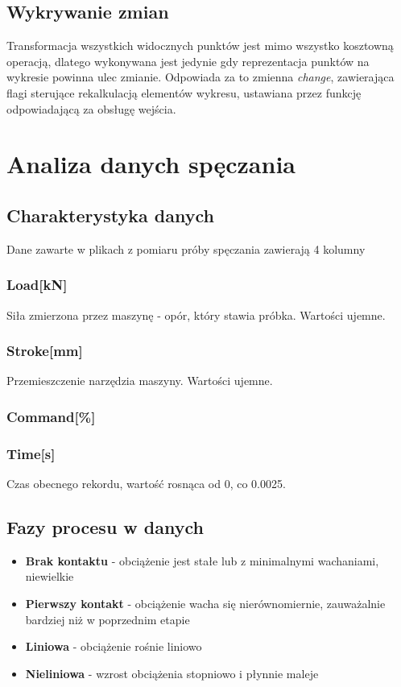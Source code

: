 \documentclass{article}
\begin{document}
	\subsection{Wykrywanie zmian}
	Transformacja wszystkich widocznych punktów jest mimo wszystko kosztowną operacją, dlatego wykonywana jest jedynie gdy reprezentacja punktów na wykresie powinna ulec zmianie. Odpowiada za to zmienna \textit{change}, zawierająca flagi sterujące rekalkulacją elementów wykresu, ustawiana przez funkcję odpowiadającą za obsługę wejścia.
	
	
	\pagebreak
	\section{Analiza danych spęczania}
	\subsection{Charakterystyka danych}
	Dane zawarte w plikach z pomiaru próby spęczania zawierają 4 kolumny
	\subsubsection{Load[kN]}
	Siła zmierzona przez maszynę - opór, który stawia próbka. Wartości ujemne.
	\subsubsection{Stroke[mm]}
	Przemieszczenie narzędzia maszyny. Wartości ujemne.
	\subsubsection{Command[\%]}
	
	\subsubsection{Time[s]}
	Czas obecnego rekordu, wartość rosnąca od 0, co 0.0025.
	
	
	\subsection{Fazy procesu w danych}
	\begin{itemize}
		\item \textbf{Brak kontaktu} - obciążenie jest stałe lub z minimalnymi wachaniami, niewielkie
		\item \textbf{Pierwszy kontakt} - obciążenie wacha się nierównomiernie, zauważalnie bardziej niż w poprzednim etapie
		\item \textbf{Liniowa} - obciążenie rośnie liniowo
		\item \textbf{Nieliniowa} - wzrost obciążenia stopniowo i płynnie maleje
	\end{itemize}
	
\end{document}
